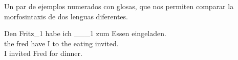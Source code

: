 \documentclass[a4paper]{article}
\begin{document}
Un par de ejemplos numerados con glosas, que nos permiten comparar la morfosintaxis de dos lenguas diferentes.

\begin{exe}
\ex
\gll Den Fritz_1 habe ich \_\_{}_1 zum Essen eingeladen.\\
the fred have I {} {to the} eating invited.\\
\glt I invited Fred for dinner.
\end{exe}

\begin{exe}\let\eachwordtwo=\sf
{}
\end{exe}
\end{document}
